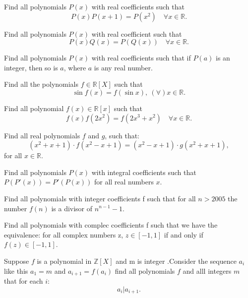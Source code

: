 \documentclass[12pt,a4paper]{memoir}
\theoremstyle{definition}
\begin{document}
\begin{question}
	Find all polynomials $P(x)$ with real coefficients such that
	\[P(x)P(x + 1) = P(x^2) \quad \forall x \in \mathbb R.\]
\end{question}

\begin{question}
	Find all polynomials $P(x)$ with real coefficient such that
	\[P(x)Q(x)=P(Q(x)) \quad \forall x \in \mathbb R.\]
\end{question}


\begin{question}
	Find all polynomials $P(x)$ with real coefficients such that if $P(a)$ is an integer, then so is $a$, where $a$ is any real number.
\end{question}


\begin{question}
	Find all the polynomials $f\in \mathbb{R}[X]$ such that
	\[\sin f(x)=f(\sin x),\ (\forall)x\in \mathbb{R}.\]
\end{question}


\begin{question}
	Find all polynomial $f(x) \in \mathbb{R}[x] $ such that 
	\[f(x)f(2x^2)=f(2x^3+x^2) \quad \forall  x\in \mathbb{R}.\]
\end{question}


\begin{question}
	Find all real polynomials $f$ and $g$, such that:
	\[(x^2+x+1)\cdot f(x^2-x+1)=(x^2-x+1)\cdot g(x^2+x+1), \]
	for all $x\in\mathbb{R}$.
\end{question}


\begin{question}
	Find all polynomials $P(x)$ with integral coefficients such that $P(P'(x))=P'(P(x))$ for all real numbers $x$.
\end{question}


\begin{question}
	Find all polynomials with integer coefficients f such that for all $n>2005$ the number $ f(n)$ is a divisor of $ n^{n-1}-1$.
\end{question}


\begin{question}
	Find all polynomials with complec coefficients f such that we have the equivalence: for all complex numbers z, $ z\in[-1,1]$ if and only if $ f(z)\in [-1,1]$.
\end{question}


\begin{question}
	Suppose $f$ is a polynomial in $\mathbb{Z}[X]$ and m is integer .Consider the sequence $a_i$ like this $a_1=m$ and $a_{i+1}=f(a_i)$ find all polynomials $f$ and alll integers $m$ that for each $i$:
	\[ a_i | a_{i+1}.\]
\end{question}
\end{document}
